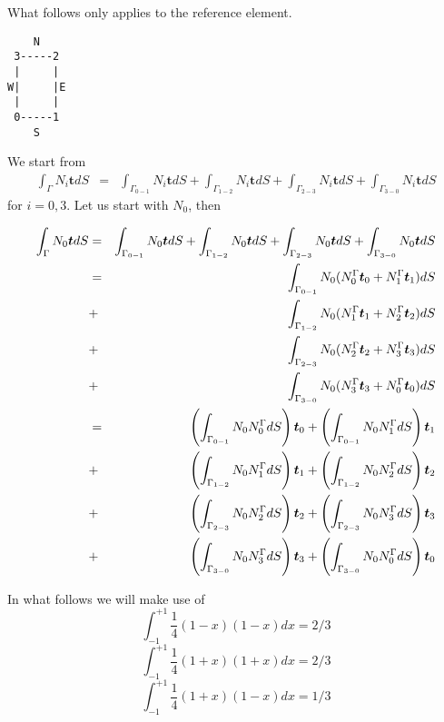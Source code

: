 \newpage
What follows only applies to the reference element.

\begin{verbatim}
    N
 3-----2
 |     |
W|     |E
 |     |
 0-----1
    S
\end{verbatim}

We start from 
\begin{eqnarray}
\int_{\Gamma} N_i {\bm t} dS 
&=& 
 \int_{\Gamma_{0-1}} N_i {\bm t} dS  
+\int_{\Gamma_{1-2}} N_i {\bm t} dS  
+\int_{\Gamma_{2-3}} N_i {\bm t} dS  
+\int_{\Gamma_{3-0}} N_i {\bm t} dS
\end{eqnarray}
for $i=0,3$. Let us start with $N_0$, then 

\begin{eqnarray}
\int_{\Gamma} N_0 {\bm t} dS 
&=& 
 \int_{\Gamma_{0-1}} N_0 {\bm t} dS  
+\int_{\Gamma_{1-2}} N_0 {\bm t} dS  
+\int_{\Gamma_{2-3}} N_0 {\bm t} dS  
+\int_{\Gamma_{3-0}} N_0 {\bm t} dS \nonumber\\
&=& \int_{\Gamma_{0-1}} N_0 (N_0^\Gamma {\bm t}_0 + N_1^\Gamma {\bm t}_1) dS \nonumber\\ 
&+& \int_{\Gamma_{1-2}} N_0 (N_1^\Gamma {\bm t}_1 + N_2^\Gamma {\bm t}_2) dS \nonumber\\
&+& \int_{\Gamma_{2-3}} N_0 (N_2^\Gamma {\bm t}_2 + N_3^\Gamma {\bm t}_3) dS \nonumber\\
&+& \int_{\Gamma_{3-0}} N_0 (N_3^\Gamma {\bm t}_3 + N_0^\Gamma {\bm t}_0) dS \nonumber\\ 
&=& \left( \int_{\Gamma_{0-1}} N_0 N_0^\Gamma dS \right) {\bm t}_0 + \left( \int_{\Gamma_{0-1}} N_0 N_1^\Gamma dS\right) {\bm t}_1 \nonumber\\ 
&+& \left( \int_{\Gamma_{1-2}} N_0 N_1^\Gamma dS \right) {\bm t}_1 + \left( \int_{\Gamma_{1-2}} N_0 N_2^\Gamma dS\right) {\bm t}_2 \nonumber\\
&+& \left( \int_{\Gamma_{2-3}} N_0 N_2^\Gamma dS \right) {\bm t}_2 + \left( \int_{\Gamma_{2-3}} N_0 N_3^\Gamma dS\right) {\bm t}_3 \nonumber\\
&+& \left( \int_{\Gamma_{3-0}} N_0 N_3^\Gamma dS \right) {\bm t}_3 + \left( \int_{\Gamma_{3-0}} N_0 N_0^\Gamma dS\right) {\bm t}_0 \nonumber  
\end{eqnarray}

In what follows we will make use of 
\[
\int_{-1}^{+1} \frac{1}{4} (1-x)(1-x) dx = 2/3 
\]
\[
\int_{-1}^{+1} \frac{1}{4} (1+x)(1+x) dx = 2/3 
\]
\[
\int_{-1}^{+1} \frac{1}{4} (1+x)(1-x) dx = 1/3 
\]



